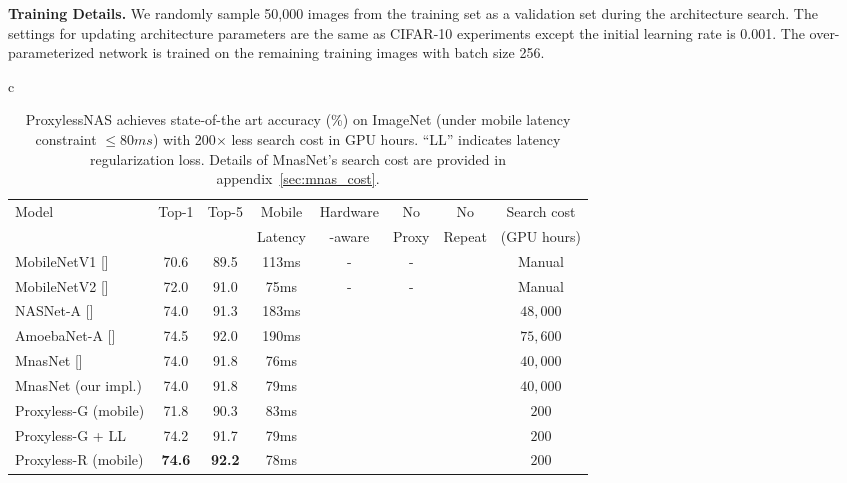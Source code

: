 \documentclass{article} \usepackage{iclr2019_conference,times}
\newcommand{\minisection}[1]{\vspace{5pt}\noindent\textbf{#1.}}
\newcommand{\xmark}{\text{\ding{55}}}
\newcommand{\cmark}{\text{\ding{51}}}
\begin{document}
\minisection{Training Details} We randomly sample 50,000 images from the training set as a validation set during the architecture search. The settings for updating architecture parameters are the same as CIFAR-10 experiments except the initial learning rate is 0.001. The over-parameterized network is trained on the remaining training images with batch size 256. 

\begin{table}[t]
    \centering
\begin{tabular}{c}
    \begin{minipage}{1\linewidth}
        \begin{tabular}{l | c | c | c | c | c | c | c }
            \hline
            \multirow{2}{*}{Model} & \multirow{2}{*}{Top-1} & \multirow{2}{*}{Top-5} & Mobile & $\!\!$Hardware$\!\!$ & No & No & $\!\!$Search cost$\!\!$ \\
            & & & Latency & -aware & Proxy & Repeat & $\!\!$(GPU hours)$\!\!$ \\
            \hline
            MobileNetV1 [\citenum{howard2017mobilenets}] & 70.6 & 89.5 & 113ms & - & - & \xmark & Manual \\
            MobileNetV2 [\citenum{sandler2018mobilenetv2}] & 72.0 & 91.0 & 75ms & - & - & \xmark & Manual \\
            \hline 
            NASNet-A [\citenum{zoph2017learning}] & 74.0 & 91.3 & 183ms & \xmark & \xmark & \xmark & $48,000$ \\
            AmoebaNet-A [\citenum{real2018regularized}] & 74.5 & 92.0 & 190ms & \xmark & \xmark & \xmark & $75,600$ \\
            MnasNet [\citenum{tan2018mnasnet}] & 74.0 & 91.8 & 76ms & \cmark & \xmark & \xmark & $40,000$  \\
            MnasNet (our impl.) & 74.0 & 91.8 & 79ms & \cmark & \xmark & \xmark & $40,000$ \\
            \hline 
            Proxyless-G (mobile)$\!\!$ & 71.8 & 90.3 & 83ms & \xmark & \cmark & \cmark & $200$ \\
            Proxyless-G + LL & 74.2 & 91.7 & 79ms & \cmark & \cmark & \cmark & $200$ \\
            Proxyless-R (mobile)$\!\!$ & \textbf{74.6} & \textbf{92.2} & 78ms & \cmark & \cmark & \cmark & $200$
            \\
            \hline
        \end{tabular}
    \end{minipage}
    \end{tabular}
\caption{ProxylessNAS achieves state-of-the art accuracy (\%) on ImageNet (under mobile latency constraint $\leq 80ms$) with 200$\times$ less search cost in GPU hours. ``LL'' indicates latency regularization loss. Details of MnasNet's search cost are provided in appendix~\ref{sec:mnas_cost}.}\label{tab:imagenet_mobile}
\end{table}
\end{document}

